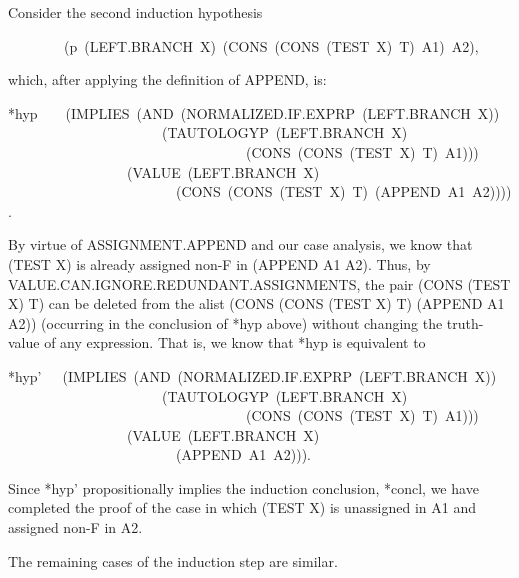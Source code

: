 \documentclass[11pt]{book}
\newenvironment{pubasis}{\begin{flushleft}\ttfamily\small}{\normalsize\rmfamily\end{flushleft}}
\begin{document}
Consider the second induction hypothesis
\begin{pubasis}
~~~~~~~~(p~(LEFT.BRANCH~X)~(CONS~(CONS~(TEST~X)~T)~A1)~A2),\\
\end{pubasis}
which, after applying the definition of APPEND, is:
\begin{pubasis}
*hyp~~~~(IMPLIES~(AND~(NOR\-MAL\-IZED.IF.EXPRP~(LEFT.BRANCH~X))\\
~~~~~~~~~~~~~~~~~~~~~~(TAU\-TOL\-OGYP~(LEFT.BRANCH~X)\\
~~~~~~~~~~~~~~~~~~~~~~~~~~~~~~~~~~(CONS~(CONS~(TEST~X)~T)~A1)))\\
~~~~~~~~~~~~~~~~~(VALUE~(LEFT.BRANCH~X)\\
~~~~~~~~~~~~~~~~~~~~~~~~(CONS~(CONS~(TEST~X)~T)~(APPEND~A1~A2)))).\\
\end{pubasis}
By virtue of ASSIGN\-MENT.APPEND and our case analysis, we know that
(TEST X) is already assigned non-F in (APPEND A1 A2).  Thus, by VALUE.CAN.IG\-NORE.RE\-DUN\-DANT.ASSIGN\-MENTS,
the pair
(CONS (TEST X) T) can be deleted from the alist (CONS (CONS (TEST X) T) (APPEND A1 A2))
(occurring in the conclusion of *hyp above)
without changing the truth-value of any expression.
That is, we know that *hyp is equivalent to
\begin{pubasis}
*hyp'~~~(IMPLIES~(AND~(NOR\-MAL\-IZED.IF.EXPRP~(LEFT.BRANCH~X))\\
~~~~~~~~~~~~~~~~~~~~~~(TAU\-TOL\-OGYP~(LEFT.BRANCH~X)\\
~~~~~~~~~~~~~~~~~~~~~~~~~~~~~~~~~~(CONS~(CONS~(TEST~X)~T)~A1)))\\
~~~~~~~~~~~~~~~~~(VALUE~(LEFT.BRANCH~X)\\
~~~~~~~~~~~~~~~~~~~~~~~~(APPEND~A1~A2))).\\
\end{pubasis}
Since *hyp' propositionally implies the induction conclusion, *concl, we have
completed the proof of the case in which (TEST X) is unassigned in A1 and
assigned non-F in A2.

The remaining cases of the induction step are similar.
\end{document}
